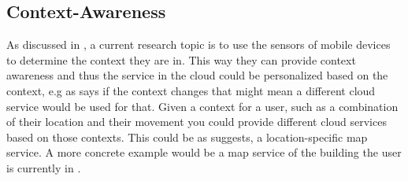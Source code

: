 \subsection{Context-Awareness}
As discussed in \citet{5557960}, a current research topic is to use the sensors of mobile devices to determine the context they are in.
This way they can provide context awareness and thus the service in the cloud could be personalized based on the context, e.g as \citet{fernando2013mobile} says if the context changes that might mean a different cloud service would be used for that. 
Given a context for a user, such as a combination of their location and their movement you could provide different cloud services based on those contexts. 
This could be as \citet{5557960} suggests, a location-specific map service. 
A more concrete example would be a map service of the building the user is currently in \citep{sanaei2014heterogeneity}.
